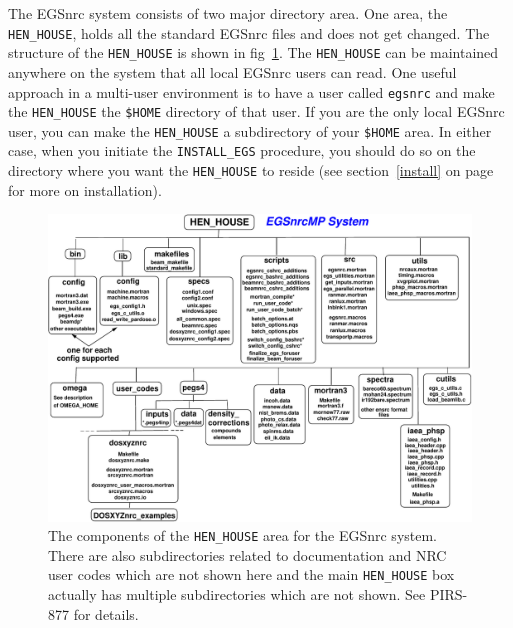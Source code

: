 The EGSnrc system consists of two major directory area.
One area, the \verb+HEN_HOUSE+, holds all the standard EGSnrc files
and does not get changed. The structure of the \verb+HEN_HOUSE+ is
shown in fig~\ref{fig_hen_house_2}.  The \verb+HEN_HOUSE+ can be maintained
anywhere on the system that all local EGSnrc users can read. One useful
approach in a multi-user environment is to have a user called {\tt egsnrc} and
make the \verb+HEN_HOUSE+ the {\tt \$HOME}  directory of that user. If you
are the only local EGSnrc user, you can make the \verb+HEN_HOUSE+ a
subdirectory of your {\tt \$HOME} area.  In either case, when you initiate
the {\tt INSTALL\_EGS} procedure, you should do so on the directory
where you want the \verb+HEN_HOUSE+ to reside (see section~\ref{install} on
page ~\pageref{install} for more on installation).
\vspace*{-0.4cm}
\begin{figure}[h]
\begin{center}
\leavevmode
\mbox{}\hspace{-1cm}
\includegraphics[width=15cm]{figures/egsnrc_system}
    \caption[Components of the {\tt HEN\_HOUSE} area for the EGSnrc
system.]
{The components of the {\tt HEN\_HOUSE} area for the EGSnrc
system. There are also subdirectories related to documentation and
NRC user codes which are not shown here and the main {\tt HEN\_HOUSE} box
actually has multiple subdirectories which are not shown. See PIRS-877 for
details\cite{Ka03}.}
\label{fig_hen_house_2}
\end{center}
\end{figure}

